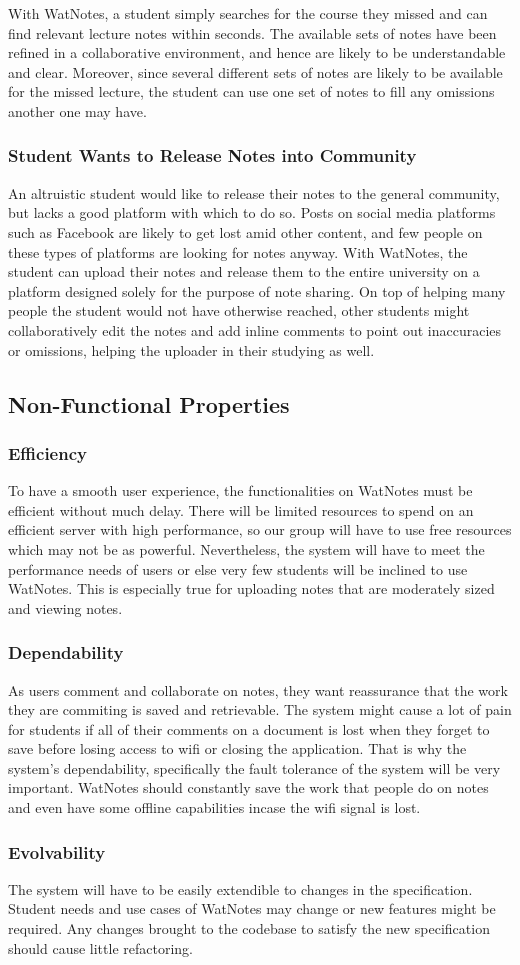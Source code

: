 \documentclass[12pt]{article}
\begin{document}
  With WatNotes, a student simply searches for the course they missed and can find relevant lecture notes within seconds. The available sets of notes have been refined in a collaborative environment, and hence are likely to be understandable and clear. Moreover, since several different sets of notes are likely to be available for the missed lecture, the student can use one set of notes to fill any omissions another one may have.
  \subsubsection{Student Wants to Release Notes into Community}
  An altruistic student would like to release their notes to the general community, but lacks a good platform with which to do so. Posts on social media platforms such as Facebook are likely to get lost amid other content, and few people on these types of platforms are looking for notes anyway. With WatNotes, the student can upload their notes and release them to the entire university on a platform designed solely for the purpose of note sharing. On top of helping many people the student would not have otherwise reached, other students might collaboratively edit the notes and add inline comments to point out inaccuracies or omissions, helping the uploader in their studying as well.
\subsection{Non-Functional Properties}
  \subsubsection{Efficiency}
  To have a smooth user experience, the functionalities on WatNotes must be efficient without much delay. There will be limited resources to spend on an efficient server with high performance, so our group will have to use free resources which may not be as powerful. Nevertheless, the system will have to meet the performance needs of users or else very few students will be inclined to use WatNotes. This is especially true for uploading notes that are moderately sized and viewing notes.

  \subsubsection{Dependability}
  As users comment and collaborate on notes, they want reassurance that the work they are commiting is saved and retrievable. The system might cause a lot of pain for students if all of their comments on a document is lost when they forget to save before losing access to wifi or closing the application. That is why the system's dependability, specifically the fault tolerance of the system will be very important. WatNotes should constantly save the work that people do on notes and even have some offline capabilities incase the wifi signal is lost. 

  \subsubsection{Evolvability}
  The system will have to be easily extendible to changes in the specification. Student needs and use cases of WatNotes may change or new features might be required. Any changes brought to the codebase to satisfy the new specification should cause little refactoring.
\end{document}
